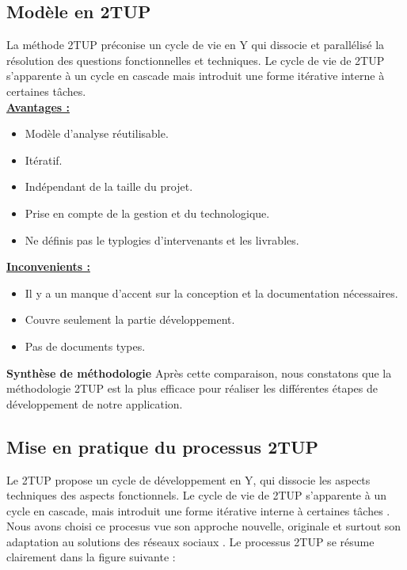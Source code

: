 \documentclass[11pt,a4paper,oneside]{book}
\begin{document}
	\subsection{Modèle en 2TUP}
	La méthode 2TUP préconise un cycle de vie en Y qui dissocie et parallélisé la résolution des
	questions fonctionnelles et techniques. Le cycle de vie de 2TUP s’apparente à un cycle en cascade mais introduit une forme itérative interne à certaines tâches.\\
	\underline{\textbf{Avantages :}}
	\begin{itemize}
		\item Modèle d’analyse réutilisable.
		\item Itératif.
		\item Indépendant de la taille du projet.
		\item Prise en compte de la gestion et du technologique.
		\item Ne définis pas le typlogies d’intervenants et les livrables.
	\end{itemize}
	\underline{\textbf{Inconvenients :}}
	\begin{itemize}
		\item Il y a un manque d’accent sur la conception et la documentation nécessaires.
		\item Couvre seulement la partie développement.
		\item Pas de documents types.
	\end{itemize}
	\textbf{Synthèse de méthodologie}
	Après cette comparaison, nous constatons que la méthodologie 2TUP est la plus efficace pour réaliser les différentes étapes de développement de notre application.
	\subsection{Mise en pratique du processus 2TUP }
	Le 2TUP propose un cycle de développement en Y, qui dissocie les aspects techniques des aspects fonctionnels. Le cycle de vie de 2TUP s’apparente à un cycle en cascade, mais introduit une forme itérative interne à certaines tâches .
	Nous avons choisi ce procesus vue son approche nouvelle, originale et surtout son adaptation au solutions des réseaux sociaux .
	Le processus 2TUP se résume clairement dans la figure suivante : 
	
\end{document}
